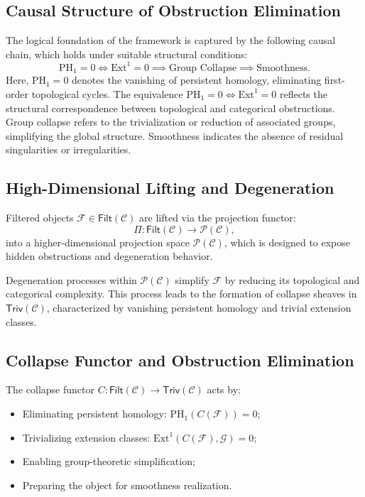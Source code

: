 \documentclass[11pt]{article}
\begin{document}
\subsection{Causal Structure of Obstruction Elimination}

The logical foundation of the framework is captured by the following causal chain, which holds under suitable structural conditions:
\[
\mathrm{PH}_1 = 0 \iff \mathrm{Ext}^1 = 0 \implies \text{Group Collapse} \implies \text{Smoothness}.
\]
Here, $\mathrm{PH}_1 = 0$ denotes the vanishing of persistent homology, eliminating first-order topological cycles. The equivalence $\mathrm{PH}_1 = 0 \iff \mathrm{Ext}^1 = 0$ reflects the structural correspondence between topological and categorical obstructions. Group collapse refers to the trivialization or reduction of associated groups, simplifying the global structure. Smoothness indicates the absence of residual singularities or irregularities.

\subsection{High-Dimensional Lifting and Degeneration}

Filtered objects $\mathcal{F} \in \mathsf{Filt}(\mathcal{C})$ are lifted via the projection functor:
\[
\Pi : \mathsf{Filt}(\mathcal{C}) \longrightarrow \mathcal{P}(\mathcal{C}),
\]
into a higher-dimensional projection space $\mathcal{P}(\mathcal{C})$, which is designed to expose hidden obstructions and degeneration behavior.

Degeneration processes within $\mathcal{P}(\mathcal{C})$ simplify $\mathcal{F}$ by reducing its topological and categorical complexity. This process leads to the formation of collapse sheaves in $\mathsf{Triv}(\mathcal{C})$, characterized by vanishing persistent homology and trivial extension classes.

\subsection{Collapse Functor and Obstruction Elimination}

The collapse functor $C : \mathsf{Filt}(\mathcal{C}) \to \mathsf{Triv}(\mathcal{C})$ acts by:

\begin{itemize}
    \item Eliminating persistent homology: $\mathrm{PH}_1(C(\mathcal{F})) = 0$;
    \item Trivializing extension classes: $\mathrm{Ext}^1(C(\mathcal{F}), \mathcal{G}) = 0$;
    \item Enabling group-theoretic simplification;
    \item Preparing the object for smoothness realization.
\end{itemize}
\end{document}

